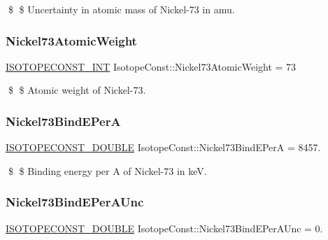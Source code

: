 \$ \$ Uncertainty in atomic mass of Nickel-\/73 in amu. \mbox{\label{group___isotope_const-_nickel-_ni73_gaf72f5c2f417c66d85ecc7282864538e5}} 
\subsubsection{\texorpdfstring{Nickel73\+Atomic\+Weight}{Nickel73AtomicWeight}}
{\footnotesize\ttfamily \mbox{\hyperlink{group___isotope_const-_macros_ga5f18360b3e99483a35c32d789e62621c}{I\+S\+O\+T\+O\+P\+E\+C\+O\+N\+S\+T\+\_\+\+I\+NT}} Isotope\+Const\+::\+Nickel73\+Atomic\+Weight = 73}

\$ \$ Atomic weight of Nickel-\/73. \mbox{\label{group___isotope_const-_nickel-_ni73_ga07a38dd1d6f511372421cb12689a5059}} 
\subsubsection{\texorpdfstring{Nickel73\+Bind\+E\+PerA}{Nickel73BindEPerA}}
{\footnotesize\ttfamily \mbox{\hyperlink{group___isotope_const-_macros_ga8f45a7272ce02c0b4c65c44636ed719a}{I\+S\+O\+T\+O\+P\+E\+C\+O\+N\+S\+T\+\_\+\+D\+O\+U\+B\+LE}} Isotope\+Const\+::\+Nickel73\+Bind\+E\+PerA = 8457.}

\$ \$ Binding energy per A of Nickel-\/73 in keV. \mbox{\label{group___isotope_const-_nickel-_ni73_ga3d2b26203d6f59946fa780ef2f6d4804}} 
\subsubsection{\texorpdfstring{Nickel73\+Bind\+E\+Per\+A\+Unc}{Nickel73BindEPerAUnc}}
{\footnotesize\ttfamily \mbox{\hyperlink{group___isotope_const-_macros_ga8f45a7272ce02c0b4c65c44636ed719a}{I\+S\+O\+T\+O\+P\+E\+C\+O\+N\+S\+T\+\_\+\+D\+O\+U\+B\+LE}} Isotope\+Const\+::\+Nickel73\+Bind\+E\+Per\+A\+Unc = 0.}

